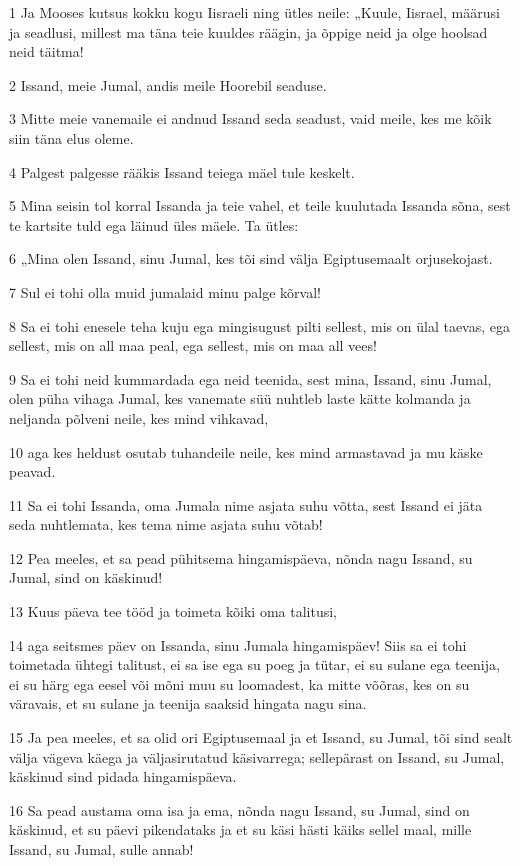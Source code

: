 \par 1 Ja Mooses kutsus kokku kogu Iisraeli ning ütles neile: „Kuule, Iisrael, määrusi ja seadlusi, millest ma täna teie kuuldes räägin, ja õppige neid ja olge hoolsad neid täitma!
\par 2 Issand, meie Jumal, andis meile Hoorebil seaduse.
\par 3 Mitte meie vanemaile ei andnud Issand seda seadust, vaid meile, kes me kõik siin täna elus oleme.
\par 4 Palgest palgesse rääkis Issand teiega mäel tule keskelt.
\par 5 Mina seisin tol korral Issanda ja teie vahel, et teile kuulutada Issanda sõna, sest te kartsite tuld ega läinud üles mäele. Ta ütles:
\par 6 „Mina olen Issand, sinu Jumal, kes tõi sind välja Egiptusemaalt orjusekojast.
\par 7 Sul ei tohi olla muid jumalaid minu palge kõrval!
\par 8 Sa ei tohi enesele teha kuju ega mingisugust pilti sellest, mis on ülal taevas, ega sellest, mis on all maa peal, ega sellest, mis on maa all vees!
\par 9 Sa ei tohi neid kummardada ega neid teenida, sest mina, Issand, sinu Jumal, olen püha vihaga Jumal, kes vanemate süü nuhtleb laste kätte kolmanda ja neljanda põlveni neile, kes mind vihkavad,
\par 10 aga kes heldust osutab tuhandeile neile, kes mind armastavad ja mu käske peavad.
\par 11 Sa ei tohi Issanda, oma Jumala nime asjata suhu võtta, sest Issand ei jäta seda nuhtlemata, kes tema nime asjata suhu võtab!
\par 12 Pea meeles, et sa pead pühitsema hingamispäeva, nõnda nagu Issand, su Jumal, sind on käskinud!
\par 13 Kuus päeva tee tööd ja toimeta kõiki oma talitusi,
\par 14 aga seitsmes päev on Issanda, sinu Jumala hingamispäev! Siis sa ei tohi toimetada ühtegi talitust, ei sa ise ega su poeg ja tütar, ei su sulane ega teenija, ei su härg ega eesel või mõni muu su loomadest, ka mitte võõras, kes on su väravais, et su sulane ja teenija saaksid hingata nagu sina.
\par 15 Ja pea meeles, et sa olid ori Egiptusemaal ja et Issand, su Jumal, tõi sind sealt välja vägeva käega ja väljasirutatud käsivarrega; sellepärast on Issand, su Jumal, käskinud sind pidada hingamispäeva.
\par 16 Sa pead austama oma isa ja ema, nõnda nagu Issand, su Jumal, sind on käskinud, et su päevi pikendataks ja et su käsi hästi käiks sellel maal, mille Issand, su Jumal, sulle annab!
